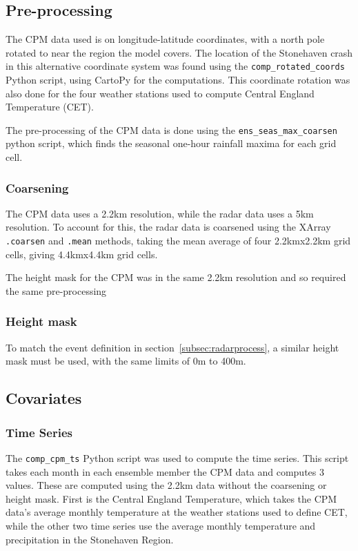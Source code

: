 \documentclass[12pt,a4paper]{report}
\begin{document}
\subsection{Pre-processing}\label{subsec:preprocess}

The CPM data used is on longitude-latitude coordinates,
    with a north pole rotated to near the region the model covers.
The location of the Stonehaven crash in this alternative coordinate system was found using the \texttt{comp\_rotated\_coords} Python script,
    using CartoPy for the computations.
This coordinate rotation was also done for the four weather stations used to compute Central England Temperature (CET).

The pre-processing of the CPM data is done using the \texttt{ens\_seas\_max\_coarsen} python script,
    which finds the seasonal one-hour rainfall maxima for each grid cell.

\subsubsection{Coarsening}

The CPM data uses a 2.2km resolution,
    while the radar data uses a 5km resolution.
To account for this,
    the radar data is coarsened using the XArray \texttt{.coarsen} and \texttt{.mean} methods,
    taking the mean average of four 2.2kmx2.2km grid cells, giving 4.4kmx4.4km grid cells.

The height mask for the CPM was in the same 2.2km resolution
    and so required the same pre-processing

\subsubsection{Height mask}

To match the event definition in section~\ref{subsec:radarprocess},
    a similar height mask must be used,
    with the same limits of 0m to 400m.

\subsection{Covariates}\label{subsec:covfit}

\subsubsection{Time Series}

The \texttt{comp\_cpm\_ts} Python script was used to compute the time series.
This script takes each month in each ensemble member the CPM data and computes 3 values.
These are computed using the 2.2km data without the coarsening or height mask.
First is the Central England Temperature,
    which takes the CPM data's average monthly temperature at the weather stations used to define CET,
    while the other two time series use the average monthly temperature and precipitation in the Stonehaven Region.
\end{document}
